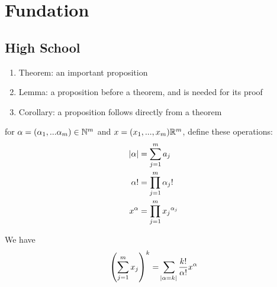 \chapter{Fundation}

\section{High School}

\begin{enumerate}
    \item Theorem: an important proposition
    \item Lemma: a proposition before a theorem, and is needed for its proof
    \item Corollary: a proposition follows directly from a theorem
\end{enumerate}


\begin{theorem}
    for $\alpha=(\alpha_1, ... \alpha_m) \in \mathbb{N}^m$ and $x=(x_1, ..., x_m) \mathbb{R}^m$, define these operations:
    \begin{equation}
        \begin{aligned}
            \abs{\alpha} &= \sum_{j=1}^m a_j \\
            \alpha ! &= \prod_{j=1}^m \alpha_j ! \\
            x^\alpha &= \prod_{j=1}^m {x_j}^{\alpha_j}
        \end{aligned}
    \end{equation}
    
    We have
    \begin{equation}
        \left(\sum_{j=1}^m x_j \right)^k = \sum_{\abs{\alpha = k}} \frac{k!}{\alpha !} x^\alpha
    \end{equation}
\end{theorem}





